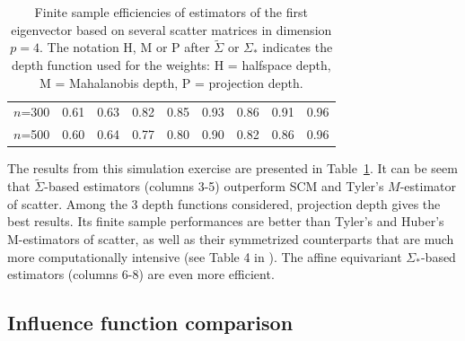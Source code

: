 \begin{table}[t]
\begin{scriptsize}
\begin{tabular}{c|cc|ccc|ccc}
    $n$=300            & 0.61 & 0.63  & 0.82   & 0.85   & 0.93  & 0.86    & 0.91    & 0.96   \\
    $n$=500            & 0.60 & 0.64  & 0.77   & 0.80   & 0.90  & 0.82    & 0.86    & 0.96   \\ \hline
    \end{tabular}
\end{scriptsize}
\caption{Finite sample efficiencies of estimators of the first eigenvector based on 
several scatter matrices in dimension $p=4$. The notation
 H, M or P after $\tilde{\Sigma}$ or ${\Sigma}_{*}$ indicates the depth function 
 used for the weights: H = halfspace depth, M = Mahalanobis depth, P = projection depth.}
\label{table:FSEtable4}
\end{table}

The results from this simulation exercise are presented in Table~\ref{table:FSEtable4}.
It can be seem that  $\tilde{\Sigma}$-based estimators (columns 3-5) 
outperform SCM and Tyler's $M$-estimator of scatter. Among the 3 depth functions 
considered, projection depth gives the best results. Its finite sample performances are 
better than Tyler's and Huber's M-estimators of scatter, as well as their symmetrized 
counterparts that are much more computationally intensive (see Table 4 in 
\cite{ref:JMVA071611_Sirkiaetal}). The affine equivariant ${\Sigma}_{*}$-based estimators (columns 6-8) are even more efficient.

\subsection{Influence function comparison}

